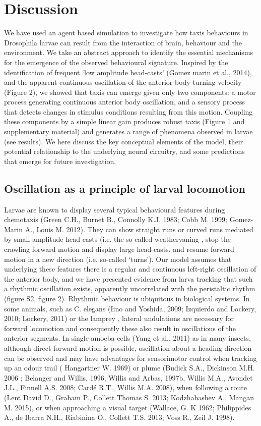 \documentclass[10pt,a4paper]{article}
\begin{document}
\section{Discussion}
We have used an agent based simulation to investigate how taxis behaviours in Drosophila larvae can result from the interaction of brain, behaviour and the environment. We take an abstract approach to identify the essential mechanisms for the emergence of the observed behavioural signature. Inspired by the identification of frequent ‘low amplitude head-casts’ (Gomez marin et al., 2014), and the apparent continuous oscillation of the anterior body turning velocity (Figure 2), we showed that taxis can emerge given only two components: a motor process generating continuous anterior body oscillation, and a sensory process that detects changes in stimulus conditions resulting from this motion. Coupling these components by a simple linear gain produces robust taxis (Figure 1 and supplementary material) and generates a range of phenomena observed in larvae (see results). We here discuss the key conceptual elements of the model, their potential relationship to the underlying neural circuitry, and some predictions that emerge for future investigation.

\subsection{Oscillation as a principle of larval locomotion}
Larvae are known to display several typical behavioural features during chemotaxis (Green C.H., Burnet B., Connolly K.J. 1983; Cobb M. 1999; Gomez-Marin A., Louis M. 2012). They can show straight runs or curved runs mediated by small amplitude head-casts (i.e. the so-called weathervaning \cite{iino2009parallel,ohashi2014novel,gomez2014multilevel}, stop the crawling forward motion and display large head-casts, and resume forward motion in a new direction (i.e. so-called ‘turns’). Our model assumes that underlying these features there is a regular and continuous left-right oscillation of the anterior body, and we have presented evidence from larva tracking that such a rhythmic oscillation exists, apparently uncorrelated with the peristaltic rhythm (figure S2, figure 2). Rhythmic behaviour is ubiquitous in biological systems. In some animals, such as C. elegans (Iino and Yoshida, 2009; Izquierdo and Lockery, 2010; Lockery, 2011) or the lamprey \citep{lansner1997realistic,wilson1999spikes}, lateral undulations are necessary for forward locomotion and consequently these also result  in oscillations of the anterior segments. In single amoeba cells (Yang et al., 2011) as in many insects, although direct forward motion is possible, oscillation about a heading direction can be observed and may have advantages for sensorimotor control when tracking up an odour trail ( Hangartner W. 1969) or plume (Budick S.A., Dickinson M.H. 2006 ; Belanger and Willis, 1996; Willis and Arbas, 1997b, Willis M.A., Avondet J.L., Finnell A.S. 2008; Cardé R.T., Willis M.A. 2008), when following a route (Lent David D., Graham P., Collett Thomas S. 2013; Kodzhabashev A., Mangan M. 2015), or when approaching a visual target (Wallace, G. K 1962; Philippides A., de Ibarra N.H., Riabinina O., Collett T.S. 2013; Voss R., Zeil J. 1998).
\end{document}
